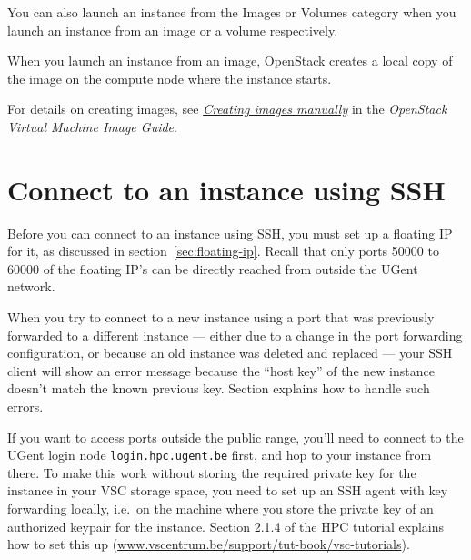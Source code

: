 You can also launch an instance from the Images or Volumes category when
you launch an instance from an image or a volume respectively.

When you launch an instance from an image, OpenStack creates a local
copy of the image on the compute node where the instance starts.

For details on creating images, see
\href{https://docs.openstack.org/image-guide/create-images-manually.html}{\emph{Creating
images manually}} in the \emph{OpenStack Virtual Machine Image Guide}.

\section{Connect to an instance using SSH}\label{connect-to-your-instance-using-ssh}
Before you can connect to an instance using SSH, you must set up a
floating IP for it, as discussed in section~\ref{sec:floating-ip}.
Recall that only ports 50000 to 60000 of the floating IP's can be
directly reached from outside the UGent network.

 When you try to connect to a new instance using a port
that was previously forwarded to a different instance --- either due
to a change in the port forwarding configuration, or because an old
instance was deleted and replaced --- your SSH client will show an
error message because the ``host key'' of the new instance doesn't
match the known previous key.  Section 
explains how to handle such errors.

 If you want to access ports outside the public range,
you'll need to connect to the UGent login node
\lstinline{login.hpc.ugent.be} first, and hop to your instance from
there.  To make this work without storing the required private key for
the instance in your VSC storage space, you need to set up an SSH
agent with key forwarding locally, i.e.\ on the machine where you
store the private key of an authorized keypair for the instance.
Section 2.1.4 of the HPC tutorial explains how to set this up
(\href{https://www.vscentrum.be/support/tut-book/vsc-tutorials}{www.vscentrum.be/support/tut-book/vsc-tutorials}).

